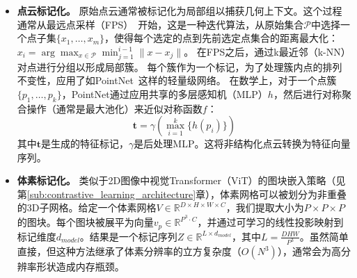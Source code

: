 \documentclass[../../book-main_zh.tex]{subfiles}
\begin{document}
\begin{itemize}
\item \textbf{点云标记化。}
原始点云通常被标记化为局部组以捕获几何上下文。这个过程通常从最远点采样（FPS）~\cite{eldar1997farthest}开始，这是一种迭代算法，从原始集合$\mathcal{P}$中选择一个点子集$\{x_1, \dots, x_m\}$，使得每个选定的点到先前选定点集合的距离最大化：
$x_{i} = \arg\max_{x \in \mathcal{P}} \min_{j=1}^{i-1} \|x - x_j\|$。
在FPS之后，通过k最近邻（k-NN）对点进行分组以形成局部簇。
每个簇作为一个标记，为了处理簇内点的排列不变性，应用了如PointNet~\cite{qi2017pointnet}这样的轻量级网络。
在数学上，对于一个点簇$\{p_1, \dots, p_k\}$，PointNet通过应用共享的多层感知机（MLP）$h$，然后进行对称聚合操作（通常是最大池化）来近似对称函数$f$：
\begin{equation}
    \boldsymbol{t} = \gamma \left( \max_{i=1}^k \{ h(p_i) \} \right)
\end{equation}
其中$\boldsymbol{t}$是生成的特征标记，$\gamma$是后处理MLP。这将非结构化点云转换为特征向量序列。





\item \textbf{体素标记化。}
类似于2D图像中视觉Transformer（ViT）的图块嵌入策略（见第\ref{sub:contrastive_learning_architecture}章），体素网格可以被划分为非重叠的3D子网格。给定一个体素网格$V \in \mathbb{R}^{D \times H \times W \times C}$，我们提取大小为$P \times P \times P$的图块。每个图块被展平为向量$v_p \in \mathbb{R}^{P^3 \cdot C}$，并通过可学习的线性投影映射到标记维度$d_{model}$。结果是一个标记序列$Z \in \mathbb{R}^{L \times d_{model}}$，其中$L = \frac{DHW}{P^3}$。虽然简单直接，但这种方法继承了体素分辨率的立方复杂度（$O(N^3)$），通常会为高分辨率形状造成内存瓶颈。




\end{itemize}
\end{document}

